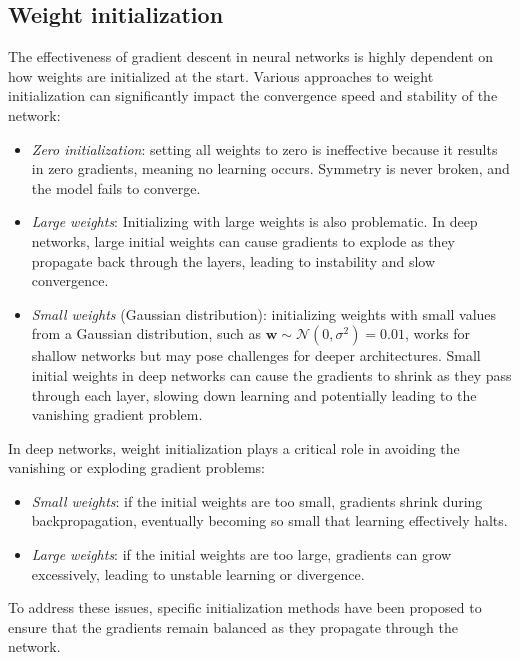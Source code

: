 \subsection{Weight initialization}
The effectiveness of gradient descent in neural networks is highly dependent on how weights are initialized at the start. 
Various approaches to weight initialization can significantly impact the convergence speed and stability of the network: 
\begin{itemize}
    \item \textit{Zero initialization}: setting all weights to zero is ineffective because it results in zero gradients, meaning no learning occurs. 
        Symmetry is never broken, and the model fails to converge.
    \item \textit{Large weights}: Initializing with large weights is also problematic. 
        In deep networks, large initial weights can cause gradients to explode as they propagate back through the layers, leading to instability and slow convergence.
    \item \textit{Small weights} (Gaussian distribution): initializing weights with small values from a Gaussian distribution, such as $\mathbf{w}\sim \mathcal{N}(0,\sigma^2)=0.01$, works for shallow networks but may pose challenges for deeper architectures. 
        Small initial weights in deep networks can cause the gradients to shrink as they pass through each layer, slowing down learning and potentially leading to the vanishing gradient problem.
\end{itemize}
In deep networks, weight initialization plays a critical role in avoiding the vanishing or exploding gradient problems:
\begin{itemize}
    \item \textit{Small weights}: if the initial weights are too small, gradients shrink during backpropagation, eventually becoming so small that learning effectively halts.
    \item \textit{Large weights}: if the initial weights are too large, gradients can grow excessively, leading to unstable learning or divergence.
\end{itemize}
To address these issues, specific initialization methods have been proposed to ensure that the gradients remain balanced as they propagate through the network.

